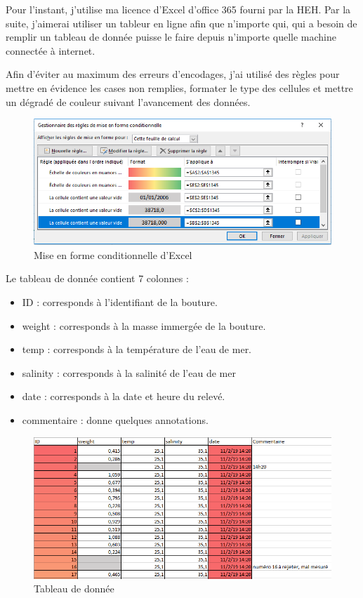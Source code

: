 \documentclass[]{report}
\begin{document}
Pour l'instant, j'utilise ma licence d'Excel d'office 365 fourni par la
HEH. Par la suite, j'aimerai utiliser un tableur en ligne afin que
n'importe qui, qui a besoin de remplir un tableau de donnée puisse le
faire depuis n'importe quelle machine connectée à internet.

Afin d'éviter au maximum des erreurs d'encodages, j'ai utilisé des
règles pour mettre en évidence les cases non remplies, formater le type
des cellules et mettre un dégradé de couleur suivant l'avancement des
données.

\begin{figure}[h!]
\includegraphics[]{../image/excel3.PNG}
\caption{Mise en forme conditionnelle d'Excel}
\end{figure}

Le tableau de donnée contient 7 colonnes :

\begin{itemize}
\item
  ID : corresponds à l'identifiant de la bouture.
\item
  weight : corresponds à la masse immergée de la bouture.
\item
  temp : corresponds à la température de l'eau de mer.
\item
  salinity : corresponds à la salinité de l'eau de mer
\item
  date : corresponds à la date et heure du relevé.
\item
  commentaire : donne quelques annotations.
\end{itemize}

\begin{figure}[h!]
\includegraphics[]{../image/excel1.PNG}
\caption{Tableau de donnée}
\end{figure}
\end{document}
